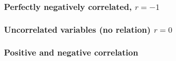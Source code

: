 \documentclass[handout]{beamer}
\begin{document}
   \begin{frame}
   \frametitle{Perfectly negatively correlated, $r=-1$}
   \begin{center}
   \end{center}

   \end{frame}



   \begin{frame}
   \frametitle{Uncorrelated variables (no relation) $r=0$}
   \begin{center}
   \end{center}

   \end{frame}



   \begin{frame}
   \frametitle{Positive and negative correlation}
   \begin{center}
   \end{center}

   \end{frame}

\end{document}

